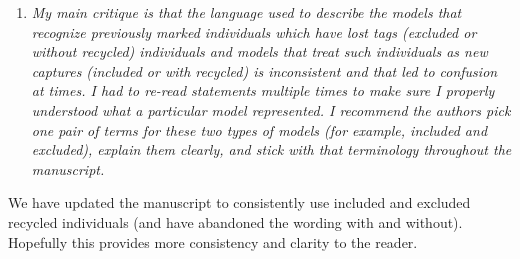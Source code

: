 \documentclass[12pt]{article}
\begin{document}
\begin{enumerate}
\item  {\it My main critique is that the language used to describe the models that recognize previously marked individuals which have lost tags (excluded or without recycled) individuals and models that treat such individuals as new captures (included or with recycled) is inconsistent and that led to confusion at times. I had to re-read statements multiple times to make sure I properly understood what a particular model represented. I recommend the authors pick one pair of terms for these two types of models (for example, included and excluded), explain them clearly, and stick with that terminology throughout the manuscript.}
\end{enumerate}
We have updated the manuscript to consistently use included and excluded recycled individuals (and have abandoned the wording with and without). Hopefully this provides more consistency and clarity to the reader.

\bigskip
\end{document}
